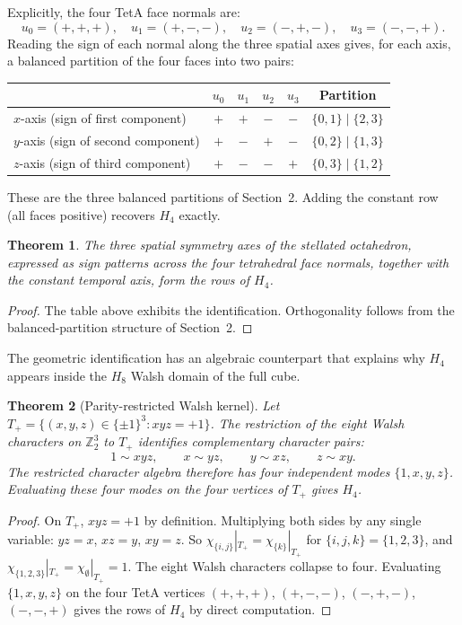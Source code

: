 \documentclass[11pt]{article}
\newtheorem{theorem}{Theorem}
\begin{document}
Explicitly, the four TetA face normals are:
\[
u_0 = (+,+,+),\quad
u_1 = (+,-,-),\quad
u_2 = (-,+,-),\quad
u_3 = (-,-,+).
\]
Reading the sign of each normal along the three spatial axes
gives, for each axis, a balanced partition of the four faces into
two pairs:
\begin{center}
\begin{tabular}{lccccc}
\toprule
& $u_0$ & $u_1$ & $u_2$ & $u_3$ & Partition \\
\midrule
$x$-axis (sign of first component)
  & $+$ & $+$ & $-$ & $-$ & $\{0,1\}\mid\{2,3\}$ \\
$y$-axis (sign of second component)
  & $+$ & $-$ & $+$ & $-$ & $\{0,2\}\mid\{1,3\}$ \\
$z$-axis (sign of third component)
  & $+$ & $-$ & $-$ & $+$ & $\{0,3\}\mid\{1,2\}$ \\
\bottomrule
\end{tabular}
\end{center}
These are the three balanced partitions of Section~2.  Adding the
constant row (all faces positive) recovers $H_4$ exactly.

\begin{theorem}
The three spatial symmetry axes of the stellated octahedron,
expressed as sign patterns across the four tetrahedral face
normals, together with the constant temporal axis, form the rows
of $H_4$.
\end{theorem}

\begin{proof}
The table above exhibits the identification.  Orthogonality
follows from the balanced-partition structure of Section~2.
\end{proof}

The geometric identification has an algebraic counterpart that
explains why $H_4$ appears inside the $H_8$ Walsh domain of the
full cube.

\begin{theorem}[Parity-restricted Walsh kernel]
Let $T_+=\{(x,y,z)\in\{\pm1\}^3:xyz=+1\}$.  The restriction of
the eight Walsh characters on $\mathbb Z_2^3$ to $T_+$ identifies
complementary character pairs:
\[
        1\sim xyz,\qquad x\sim yz,\qquad y\sim xz,\qquad z\sim xy.
\]
The restricted character algebra therefore has four independent
modes $\{1,x,y,z\}$.  Evaluating these four modes on the four
vertices of $T_+$ gives $H_4$.
\end{theorem}

\begin{proof}
On $T_+$, $xyz=+1$ by definition.  Multiplying both sides by any
single variable: $yz = x$, $xz = y$, $xy = z$.  So
$\chi_{\{i,j\}}|_{T_+} = \chi_{\{k\}}|_{T_+}$ for
$\{i,j,k\}=\{1,2,3\}$, and
$\chi_{\{1,2,3\}}|_{T_+} = \chi_\emptyset|_{T_+} = 1$.  The
eight Walsh characters collapse to four.  Evaluating
$\{1,x,y,z\}$ on the four TetA vertices $(+,+,+)$, $(+,-,-)$,
$(-,+,-)$, $(-,-,+)$ gives the rows of $H_4$ by direct
computation.
\end{proof}
\end{document}
